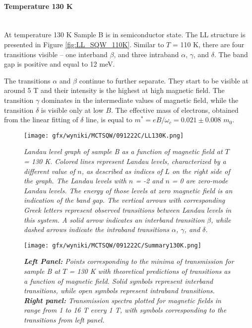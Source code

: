 \documentclass[titlepage,a4paper]{book}
\newcommand{\wciecie}{\quad\phantom{v}}
\newcommand{\myparagraph}[1]{\paragraph{#1}\mbox{}\\}
\begin{document}
\myparagraph{Temperature 130 K}
\wciecie
At temperature 130 K Sample B is in semiconductor state. The LL structure is presented in Figure \ref{fig:LL_SQW_110K}. Similar to $T$ = 110 K, there are four transitions visible -- one interband $\beta$, and three intraband $\alpha$, $\gamma$, and $\delta$. The band gap is positive and equal to 12 meV.

The transitions $\alpha$ and $\beta$ continue to further separate. They start to be visible at around 5 T and their intensity is the highest at high magnetic field. The transition $\gamma$ dominates in the intermediate values of magnetic field, while the transition $\delta$ is visible only at low $B$. The effective mass of electrons, obtained from the linear fitting of $\delta$ line, is equal to $m^* = eB/\omega_c = 0.021 \pm 0.008$ $m_0$.

\begin{figure}[ht]
	\centering
	\texttt{[image: gfx/wyniki/MCTSQW/091222C/LL130K.png]}
	\vspace{-10pt}
	\caption{\textit{Landau level graph of sample B as a function of magnetic field at $T$ = 130 K. Colored lines represent Landau levels, characterized by a different value of $n$, as described as indices of $L$ on the right side of the graph. The Landau levels with $n$ = -2 and $n$ = 0 are zero-mode Landau levels. The energy of those levels at zero magnetic field is an indication of the band gap. The vertical arrows with corresponding Greek letters represent observed transitions between Landau levels in this system. A solid arrow indicates an interband transition $\beta$, while dashed arrows indicate the intraband transitions $\alpha$, $\gamma$, and $\delta$.}}
	\label{fig:LL_SQW_130K}
\end{figure}
\begin{figure}[H]
	\centering
	\texttt{[image: gfx/wyniki/MCTSQW/091222C/Summary130K.png]}
	\vspace{-10pt}
	\caption{\textit{\textbf{Left Panel:} Points corresponding to the minima of transmission for sample B at $T$ = 130 K with theoretical predictions of transitions as a function of magnetic field. Solid symbols represent interband transitions, while open symbols represent intraband transitions. \textbf{Right panel:} Transmission spectra plotted for magnetic fields in range from 1 to 16 T every 1 T, with symbols corresponding to the transitions from left panel.}}
	\label{fig:Summary_SQW_130K}
\end{figure}
\end{document}
